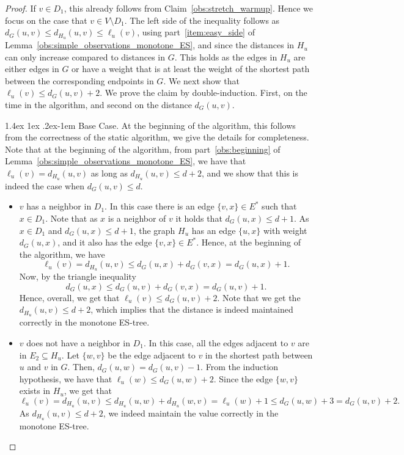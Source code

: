 \documentclass[11pt]{article}
\makeatletter
\theoremstyle{definition}
\theoremstyle{remark}
\renewcommand{\paragraph}{%
  \@startsection{paragraph}{4}%
  {\z@}{1.4ex \@plus 1ex \@minus .2ex}{-1em}%
  {\normalfont\normalsize\bfseries}%
}
\makeatother
\begin{document}
\begin{titlepage}
\begin{proof}
If $v \in D_1$, this already follows from Claim~\ref{obs:stretch_warmup}. Hence we focus on the case that $v \in V \setminus D_1$. The left side of the inequality follows as $d_G(u,v) \leq d_{H_u}(u,v) \leq \ell_u(v)$, using part~\ref{item:easy_side} of Lemma~\ref{obs:simple_observations_monotone_ES}, and since the distances in $H_u$ can only increase compared to distances in $G$. This holds as the edges in $H_u$ are either edges in $G$ or have a weight that is at least the weight of the shortest path between the corresponding endpoints in $G$.
We next show that $\ell_u(v) \leq d_G(u,v) +2$.
We prove the claim by double-induction. First, on the time in the algorithm, and second on the distance $d_G(u,v)$.

\paragraph{Base Case.} At the beginning of the algorithm, this follows from the correctness of the static algorithm, we give the details for completeness. Note that at the beginning of the algorithm, from part~\ref{obs:beginning} of Lemma~\ref{obs:simple_observations_monotone_ES}, we have that $\ell_u(v)=d_{H_u}(u,v)$ as long as $d_{H_u}(u,v) \leq d+2$, and we show that this is indeed the case when $d_G(u,v) \leq d$. 

\begin{itemize}
    \item [Case 1:] $v$ has a neighbor in $D_1$. In this case there is an edge $\{v,x\} \in E^*$ such that $x \in D_1$. Note that as $x$ is a neighbor of $v$ it holds that $d_G(u,x) \leq d+1$. As $x \in D_1$ and $d_G(u,x) \leq d+1$, the graph $H_u$ has an edge $\{u,x\}$ with weight $d_G(u,x)$, and it also has the edge $\{v,x\} \in E^*$. Hence, at the beginning of the algorithm, we have $$\ell_u(v) = d_{H_u}(u,v) \leq d_G(u,x) + d_G(v,x) = d_G(u,x)+1.$$ Now, by the triangle inequality $$d_G(u,x) \leq d_G(u,v)+d_G(v,x)=d_G(u,v)+1.$$ Hence, overall, we get that $\ell_u(v) \leq d_G(u,v) +2$. Note that we get the $d_{H_u}(u,v) \leq d+2$, which implies that the distance is indeed maintained correctly in the monotone ES-tree.
    \item [Case 2:] $v$ does not have a neighbor in $D_1$. In this case, all the edges adjacent to $v$ are in $E_2 \subseteq H_u$. Let $\{w,v\}$ be the edge adjacent to $v$ in the shortest path between $u$ and $v$ in $G$. Then, $d_G(u,w) = d_G(u,v)-1$. From the induction hypothesis, we have that $\ell_u(w) \leq d_G(u,w) +2$. Since the edge $\{w,v\}$ exists in $H_u$, we get that $$\ell_u(v) = d_{H_u}(u,v) \leq d_{H_u}(u,w) + d_{H_u}(w,v)= \ell_u(w)+1 \leq d_G(u,w)+3 = d_G(u,v) + 2.$$ As $d_{H_u}(u,v) \leq d+2$, we indeed maintain the value correctly in the monotone ES-tree.
\end{itemize}



\end{proof}
\end{titlepage}
\end{document}
